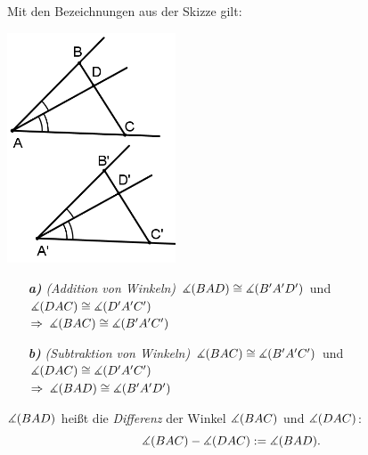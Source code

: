 \begin{thm}\label{thm:satz.s1l}  Mit den Bezeichnungen aus der Skizze
  gilt:





\centerline{\includegraphics[width=5cm]{BILDER/1-2-15b-Winkel.png}}


\begin{enumerate}
\item[\emph{\textbf{a)}}]\emph{(Addition von Winkeln)}
$\wi(BAD)\cong\wi(B'A'D')$ und $\wi(DAC)\cong\wi(D'A'C')$\\
$\Rightarrow\;\wi(BAC)\cong\wi(B'A'C')$
\item[\emph{\textbf{b)}}]\emph{(Subtraktion von Winkeln)}
$\wi(BAC)\cong\wi(B'A'C')$ und $\wi(DAC)\cong\wi(D'A'C')$\\
$\Rightarrow\;\wi(BAD)\cong\wi(B'A'D')$
\end{enumerate}
\end{thm}


$\wi(BAD)$ hei{\ss}t die \emph{Differenz} der Winkel $\wi(BAC)$ und
$\wi(DAC)$: \[\wi(BAC)-\wi(DAC):=\wi(BAD).\]


